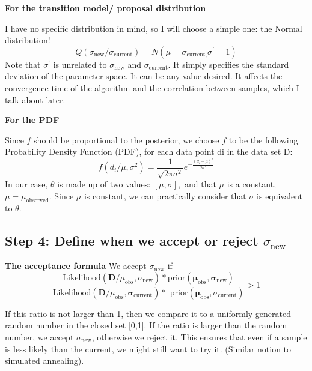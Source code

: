 \textbf{For the transition model/ proposal distribution}

I have no specific distribution in mind, so I will choose a simple one: the Normal distribution!
\begin{equation}Q\left(\sigma_{\text {new}} / \sigma_{\text {current}}\right)=N\left(\mu=\sigma_{\text {current},} \sigma^{\prime}=1\right)\end{equation}
Note that  $\sigma^\prime$ is unrelated to $\sigma_\textrm{new}$ and $\sigma_\textrm{current}$. It simply specifies the standard deviation of the parameter space. It can be any value desired. It affects the convergence time of the algorithm and the correlation between samples, which I talk about later.

\textbf{For the PDF}

Since $f$ should be proportional to the posterior, we choose $f$ to be the following Probability Density Function (PDF), for each data point di in the data set D:
\begin{equation}f\left(d_{i} / \mu, \sigma^{2}\right)=\frac{1}{\sqrt{2 \pi \sigma^{2}}} e^{-\frac{\left(d_{i}-\mu\right)^{2}}{2 \sigma^{2}}}\end{equation}
In our case, $\theta$ is made up of two values: $[\mu, \sigma],$ and that $\mu$ is a constant, $\mu=\mu_\textrm{observed}$.
Since  $\mu$ is constant, we can practically consider that $\sigma$ is equivalent to $\theta$.

\subsection{Step 4: Define when we accept or reject $\sigma_\textrm{new}$}

\textbf{The acceptance formula}
We accept $\sigma_\textrm{new}$ if 
\begin{equation}\frac{\text {Likelihood}\left(\boldsymbol{D} / \mu_{\text {obs}}, \sigma_{\text {new}}\right) * \text {prior}\left(\boldsymbol{\mu}_{\text {obs}}, \boldsymbol{\sigma}_{\text {new}}\right)}{\text {Likelihood}\left(\boldsymbol{D} / \mu_{\text {obs}}, \boldsymbol{\sigma}_{\text {current}}\right) * \text { prior}\left(\boldsymbol{\mu}_{\text {obs}}, \sigma_{\text {current}}\right)}>1
\label{eq:equation01}
\end{equation}

If this ratio is not larger than 1, then we compare it to a uniformly generated random number in the closed set [0,1]. If the ratio is larger than the random number, we accept $\sigma_\textrm{new}$, otherwise we reject it. This ensures that even if a sample is less likely than the current, we might still want to try it. (Similar notion to simulated annealing).

